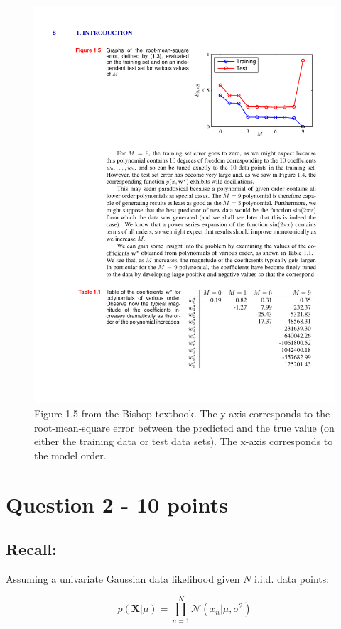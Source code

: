 \documentclass[11pt]{article}
\begin{document}
\begin{figure}[h!]
\centering
\includegraphics{problem1.pdf}
\caption{Figure 1.5 from the Bishop textbook.  The y-axis corresponds to the root-mean-square error between the predicted and the true value (on either the training data or test data sets).  The x-axis corresponds to the model order. }
\end{figure}

\section*{Question 2 - 10 points}

\subsection*{Recall:}

Assuming a univariate Gaussian data likelihood given $N$ i.i.d. data points:

\begin{equation}
p(\mathbf{X}|\mu) = \prod^{N}_{n=1}\mathcal{N}(x_n|\mu,\sigma^2)
\end{equation}
\end{document}
